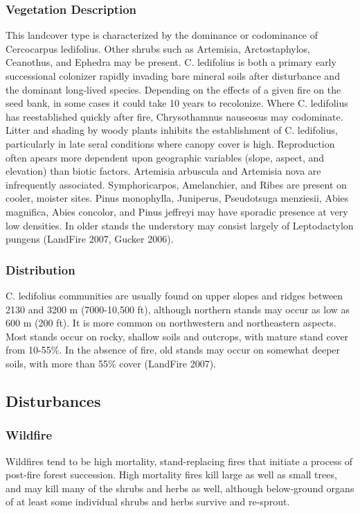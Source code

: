 \subsubsection{Vegetation Description}
This landcover type is characterized by the dominance or codominance of Cercocarpus ledifolius. Other shrubs such as Artemisia, Arctostaphylos, Ceanothus, and Ephedra may be present. C. ledifolius is both a primary early successional colonizer rapidly invading bare mineral soils after disturbance and the dominant long-lived species. Depending on the effects of a given fire on the seed bank, in some cases it could take 10 years to recolonize. Where C. ledifolius has reestablished quickly after fire, Chrysothamnus nauseosus may codominate. Litter and shading by woody plants inhibits the establishment of C. ledifolius, particularly in late seral conditions where canopy cover is high. Reproduction often apears more dependent upon geographic variables (slope, aspect, and elevation) than biotic factors. Artemisia arbuscula and Artemisia nova are infrequently associated. Symphoricarpos, Amelanchier, and Ribes are present on cooler, moister sites. Pinus monophylla, Juniperus, Pseudotsuga menziesii, Abies magnifica, Abies concolor, and Pinus jeffreyi may have sporadic presence at very low densities. In older stands the understory may consist largely of Leptodactylon pungens (LandFire 2007, Gucker 2006).

\subsubsection{Distribution}
C. ledifolius communities are usually found on upper slopes and ridges between 2130 and 3200 m (7000-10,500 ft), although northern stands may occur as low as 600 m (200 ft). It is more common on northwestern and northeastern aspects. Most stands occur on rocky, shallow soils and outcrops, with mature stand cover from 10-55\%. In the absence of fire, old stands may occur on somewhat deeper soils, with more than 55\% cover (LandFire 2007).

\subsection*{Disturbances}

\subsubsection{Wildfire}
Wildfires tend to be high mortality, stand-replacing fires that initiate a process of post-fire forest succession. High mortality fires kill large as well as small trees, and may kill many of the shrubs and herbs as well, although below-ground organs of at least some individual shrubs and herbs survive and re-sprout. 

